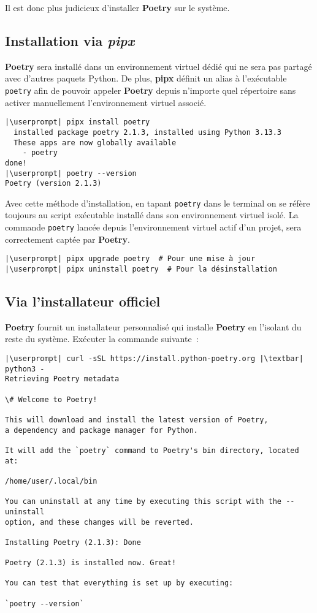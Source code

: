 Il est donc plus judicieux d'installer \textbf{Poetry} sur le système.

\subsection*{Installation via \textit{pipx}}
\textbf{Poetry} sera installé dans un environnement virtuel dédié qui ne sera pas partagé avec d’autres paquets Python. De plus, \textbf{pipx} définit un alias à l’exécutable \texttt{poetry} afin de pouvoir appeler \textbf{Poetry} depuis n’importe quel répertoire sans activer manuellement l’environnement virtuel associé.
\begin{lstlisting}[style=bash]
|\userprompt| pipx install poetry
  installed package poetry 2.1.3, installed using Python 3.13.3
  These apps are now globally available
    - poetry
done! 
|\userprompt| poetry --version
Poetry (version 2.1.3)
\end{lstlisting}

Avec cette méthode d'installation, en tapant \texttt{poetry} dans le terminal on se réfère toujours au script exécutable installé dans son environnement virtuel isolé. La commande \texttt{poetry} lancée depuis l'environnement virtuel actif d'un projet, sera correctement captée par \textbf{Poetry}.

\begin{lstlisting}[style=bash]
|\userprompt| pipx upgrade poetry  # Pour une mise à jour
|\userprompt| pipx uninstall poetry  # Pour la désinstallation
\end{lstlisting}

\subsection*{Via l'installateur officiel}
\textbf{Poetry} fournit un installateur personnalisé qui installe \textbf{Poetry} en l'isolant du reste du système. Exécuter la commande suivante :
\begin{lstlisting}[style=bash]
|\userprompt| curl -sSL https://install.python-poetry.org |\textbar| python3 -
Retrieving Poetry metadata

\# Welcome to Poetry!

This will download and install the latest version of Poetry,
a dependency and package manager for Python.

It will add the `poetry` command to Poetry's bin directory, located at:

/home/user/.local/bin

You can uninstall at any time by executing this script with the --uninstall 
option, and these changes will be reverted.

Installing Poetry (2.1.3): Done

Poetry (2.1.3) is installed now. Great!

You can test that everything is set up by executing:

`poetry --version`
\end{lstlisting}


